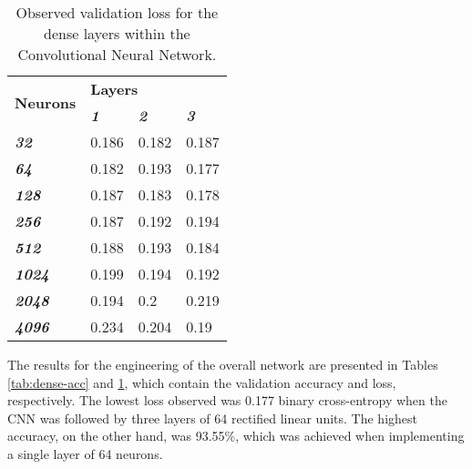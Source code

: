 \documentclass{article}
\begin{document}
\begin{table}[] \footnotesize
\centering
\caption{Observed validation loss for the dense layers within the Convolutional Neural Network.}
\label{tab:dense-loss}
\begin{tabular}{@{}llll@{}}
\toprule
\multirow{2}{*}{\textbf{Neurons}} & \multicolumn{3}{l}{\textbf{Layers}}                             \\ \cmidrule(l){2-4} 
                                  & \textit{\textbf{1}} & \textit{\textbf{2}} & \textit{\textbf{3}} \\ \cmidrule(r){1-1}
\textit{\textbf{32}}              & 0.186               & 0.182               & 0.187               \\
\textit{\textbf{64}}              & 0.182               & 0.193               & 0.177               \\
\textit{\textbf{128}}             & 0.187               & 0.183               & 0.178               \\
\textit{\textbf{256}}             & 0.187               & 0.192               & 0.194               \\
\textit{\textbf{512}}             & 0.188               & 0.193               & 0.184               \\
\textit{\textbf{1024}}            & 0.199               & 0.194               & 0.192               \\
\textit{\textbf{2048}}            & 0.194               & 0.2                 & 0.219               \\
\textit{\textbf{4096}}            & 0.234               & 0.204               & 0.19                \\ \bottomrule
\end{tabular}
\end{table}

The results for the engineering of the overall network are presented in Tables \ref{tab:dense-acc} and \ref{tab:dense-loss}, which contain the validation accuracy and loss, respectively. The lowest loss observed was 0.177 binary cross-entropy when the CNN was followed by three layers of 64 rectified linear units. The highest accuracy, on the other hand, was 93.55\%, which was achieved when implementing a single layer of 64 neurons. 
\end{document}
